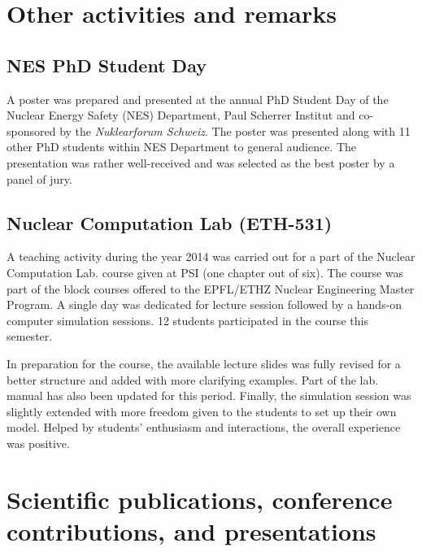 \documentclass[11pt,titlepage]{article}
\begin{document}
\section{Other activities and remarks}

\subsection{NES PhD Student Day}

A poster was prepared and presented at the annual PhD Student Day of the 
Nuclear Energy Safety (NES) Department, Paul Scherrer Institut and co-sponsored 
by the \textit{Nuklearforum Schweiz}.
The poster \cite{Wicaksono2014b} was presented along with 11 other PhD students 
within NES Department to general audience.
The presentation was rather well-received and was selected as the best 
poster by a panel of jury.


\subsection{Nuclear Computation Lab (ETH-531)}

A teaching activity during the year 2014 was carried out for a part of  
the Nuclear Computation Lab. course given at PSI (one chapter out of six).
The course was part of the block courses offered to the EPFL/ETHZ Nuclear
Engineering Master Program.
A single day was dedicated for lecture session followed by a hands-on 
computer simulation sessions.
12 students participated in the course this semester.

In preparation for the course, the available lecture slides was fully revised
for a better structure and added with more clarifying examples.
Part of the lab. manual has also been updated for this period.
Finally, the simulation session was slightly extended with more freedom 
given to the students to set up their own model.
Helped by students' enthusiasm and interactions, the overall experience was 
positive.

\section{Scientific publications, conference contributions, and presentations}

\nocite{Wicaksono2014a}
\nocite{Wicaksono2014b}
\nocite{Wicaksono2014c}
\nocite{Wicaksono2014d}
\nocite{Wicaksono2014e}
\printbibliography[heading=none]
\end{document}
